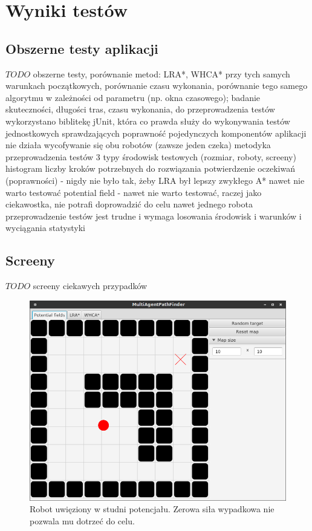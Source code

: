 \chapter{Wyniki testów}
\label{ch:tests}

\section{Obszerne testy aplikacji}
$TODO$ obszerne testy, porównanie metod: LRA*, WHCA* przy tych samych warunkach początkowych, porównanie czasu wykonania, porównanie tego samego algorytmu w zależności od parametru (np. okna czasowego); badanie skuteczności, długości tras, czasu wykonania, 
do przeprowadzenia testów wykorzystano biblitekę jUnit, która co prawda służy do wykonywania testów jednostkowych sprawdzających poprawność pojedynczych komponentów aplikacji
nie działa wycofywanie się obu robotów (zawsze jeden czeka)
metodyka przeprowadzenia testów
3 typy środowisk testowych (rozmiar, roboty, screeny)
histogram liczby kroków potrzebnych do rozwiązania
potwierdzenie oczekiwań (poprawności) - nigdy nie było tak, żeby LRA był lepszy
zwykłego A* nawet nie warto testować
potential field - nawet nie warto testować, raczej jako ciekawostka, nie potrafi doprowadzić do celu nawet jednego robota
przeprowadzenie testów jest trudne i wymaga losowania środowisk i warunków i wyciągania statystyki

\section{Screeny}
$TODO$ screeny ciekawych przypadków

\begin{figure}
	\centering
	\includegraphics[width=0.8\columnwidth]{img/robopath/field-potential-hole}
	\caption{Robot uwięziony w studni potencjału. Zerowa siła wypadkowa nie pozwala mu dotrzeć do celu.}
	\label{fig:app-tech-intellij}
\end{figure}

